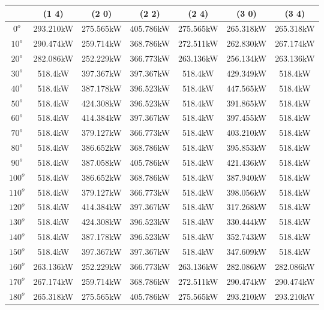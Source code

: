         \begin{table}[H]
        	\centering
        	\begin{tabular}{|c|c|c|c|c|c|c|} \hline
        			& (1 4)		& (2 0)		& (2 2)		& (2 4)		& (3 0)		& (3 4)		\\ \hline
		$0^o$	& 293.210kW	& 275.565kW	& 405.786kW	& 275.565kW	& 265.318kW	& 265.318kW	\\ \hline
		$10^o$	& 290.474kW	& 259.714kW	& 368.786kW	& 272.511kW	& 262.830kW	& 267.174kW	\\ \hline
		$20^o$	& 282.086kW	& 252.229kW	& 366.773kW	& 263.136kW	& 256.134kW	& 263.136kW	\\ \hline
		$30^o$	& 518.4kW	& 397.367kW	& 397.367kW	& 518.4kW	& 429.349kW	& 518.4kW	\\ \hline
		$40^o$	& 518.4kW	& 387.178kW	& 396.523kW	& 518.4kW	& 447.565kW	& 518.4kW	\\ \hline
		$50^o$	& 518.4kW	& 424.308kW	& 396.523kW	& 518.4kW	& 391.865kW	& 518.4kW	\\ \hline
		$60^o$	& 518.4kW	& 414.384kW	& 397.367kW	& 518.4kW	& 397.455kW	& 518.4kW	\\ \hline
		$70^o$	& 518.4kW	& 379.127kW	& 366.773kW	& 518.4kW	& 403.210kW	& 518.4kW	\\ \hline
		$80^o$	& 518.4kW	& 386.652kW	& 368.786kW	& 518.4kW	& 395.853kW	& 518.4kW	\\ \hline
		$90^o$	& 518.4kW	& 387.058kW	& 405.786kW	& 518.4kW	& 421.436kW	& 518.4kW	\\ \hline
		$100^o$	& 518.4kW	& 386.652kW	& 368.786kW	& 518.4kW	& 387.940kW	& 518.4kW	\\ \hline
		$110^o$	& 518.4kW	& 379.127kW	& 366.773kW	& 518.4kW	& 398.056kW	& 518.4kW	\\ \hline
		$120^o$	& 518.4kW	& 414.384kW	& 397.367kW	& 518.4kW	& 317.268kW	& 518.4kW	\\ \hline
		$130^o$	& 518.4kW	& 424.308kW	& 396.523kW	& 518.4kW	& 330.444kW	& 518.4kW	\\ \hline
		$140^o$	& 518.4kW	& 387.178kW	& 396.523kW	& 518.4kW	& 352.743kW	& 518.4kW	\\ \hline
		$150^o$	& 518.4kW	& 397.367kW	& 397.367kW	& 518.4kW	& 347.609kW	& 518.4kW	\\ \hline
		$160^o$	& 263.136kW	& 252.229kW	& 366.773kW	& 263.136kW	& 282.086kW	& 282.086kW	\\ \hline
		$170^o$	& 267.174kW	& 259.714kW	& 368.786kW	& 272.511kW	& 290.474kW	& 290.474kW	\\ \hline
		$180^o$	& 265.318kW	& 275.565kW	& 405.786kW	& 275.565kW	& 293.210kW	& 293.210kW	\\ \hline

\end{tabular}
\end{table}
